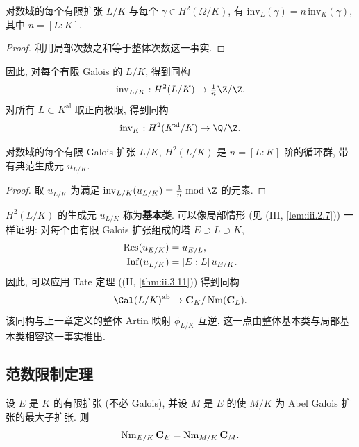 \begin{lemma}\label{lem:viii.4.6}
对数域的每个有限扩张 $L/K$ 与每个 $\gamma\in H^{2}(\Omega/K)$, 有 $\mathrm{inv}_L(\gamma)=n\,\mathrm{inv}_K(\gamma)$, 其中 $n=[L:K]$.
\end{lemma}

\begin{proof}
利用局部次数之和等于整体次数这一事实.
\end{proof}

因此, 对每个有限 Galois 的 $L/K$, 得到同构
\[
\mathrm{inv}_{L/K}:H^{2}(L/K)\to\tfrac{1}{n}\Z/\Z.
\]
对所有 $L\subset K^{\mathrm{al}}$ 取正向极限, 得到同构
\[
\mathrm{inv}_{K}:H^{2}(K^{\mathrm{al}}/K)\to\Q/\Z.
\]

\begin{theorem}\label{thm:viii.4.7}
对数域的每个有限 Galois 扩张 $L/K$, $H^{2}(L/K)$ 是 $n=[L:K]$ 阶的循环群, 带有典范生成元 $u_{L/K}$.
\end{theorem}

\begin{proof}
取 $u_{L/K}$ 为满足 $\mathrm{inv}_{L/K}(u_{L/K})=\frac{1}{n}\bmod\Z$ 的元素.
\end{proof}

$H^{2}(L/K)$ 的生成元 $u_{L/K}$ 称为\textbf{基本类}. 可以像局部情形 (见 (III, \ref{lem:iii.2.7})) 一样证明: 对每个由有限 Galois 扩张组成的塔 $E\supset L\supset K$,
\[
\begin{aligned}
\operatorname{Res}(u_{E/K})&=u_{E/L},\\
\operatorname{Inf}(u_{L/K})&=[E:L]\,u_{E/K}.
\end{aligned}
\]
因此, 可以应用 Tate 定理 ((II, \ref{thm:ii.3.11})) 得到同构
\[
\Gal(L/K)^{\mathrm{ab}}\to\mathbf{C}_{K}/\Nm(\mathbf{C}_{L}).
\]
该同构与上一章定义的整体 Artin 映射 $\phi_{L/K}$ 互逆, 这一点由整体基本类与局部基本类相容这一事实推出.

\subsection*{范数限制定理}

\begin{theorem}\label{thm:viii.4.8}
设 $E$ 是 $K$ 的有限扩张 (不必 Galois), 并设 $M$ 是 $E$ 的使 $M/K$ 为 Abel Galois 扩张的最大子扩张. 则
\[
\operatorname{Nm}_{E/K}\mathbf{C}_{E}=\operatorname{Nm}_{M/K}\mathbf{C}_{M}.
\]
\end{theorem}

